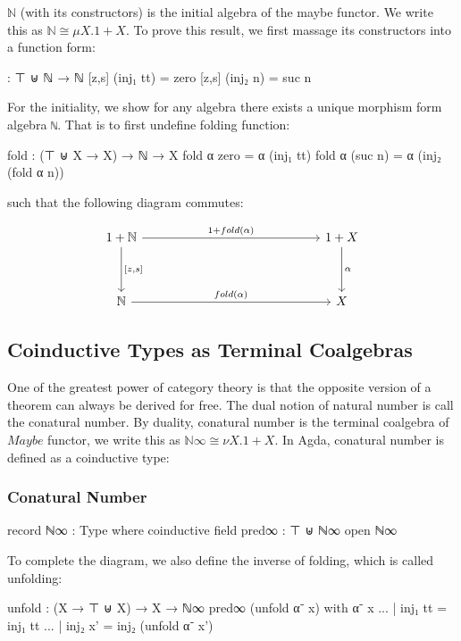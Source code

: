 $\mathbb{N}$ (with its constructors) is the initial algebra of the maybe functor. We write this as $\mathbb{N} \cong \mu X. 1 + X$. To prove this result, we first massage its constructors into a function form:

\begin{code}
[z,s] : ⊤ ⊎ ℕ → ℕ
[z,s] (inj₁ tt) = zero
[z,s] (inj₂ n) = suc n
\end{code}

For the initiality, we show for any algebra there exists a unique morphism form algebra \texttt{ℕ}. That is to first undefine folding function:

\begin{code}
fold : (⊤ ⊎ X → X) → ℕ → X
fold α zero = α (inj₁ tt)
fold α (suc n) = α (inj₂ (fold α n))
\end{code}

such that the following diagram commutes:

\[
\begin{tikzcd}[row sep=huge, column sep=5cm]
1 + \mathbb{N} \arrow[r, "1 + fold(\alpha)"] \arrow[d, "{[z,s]}"]
& 1 + X \arrow[d, "\alpha"] \\
\mathbb{N} \arrow[r, "fold(\alpha)"]
& X
\end{tikzcd}
\]

\subsection{Coinductive Types as Terminal Coalgebras}

One of the greatest power of category theory is that the opposite version of a theorem can always be derived for free. The dual notion of natural number is call the conatural number. By duality, conatural number is the terminal coalgebra of $Maybe$ functor, we write this as $\mathbb{N}\infty \cong \nu X. 1 + X$. In Agda, conatural number is defined as a coinductive type:

\subsubsection*{Conatural Number}

\begin{code}
record ℕ∞ : Type where
  coinductive
  field
    pred∞ : ⊤ ⊎ ℕ∞
open ℕ∞
\end{code}

To complete the diagram, we also define the inverse of folding, which is called unfolding:

\begin{code}
unfold : (X → ⊤ ⊎ X) → X → ℕ∞
pred∞ (unfold α⁻ x) with α⁻ x 
... | inj₁ tt = inj₁ tt
... | inj₂ x' = inj₂ (unfold α⁻ x')
\end{code}

